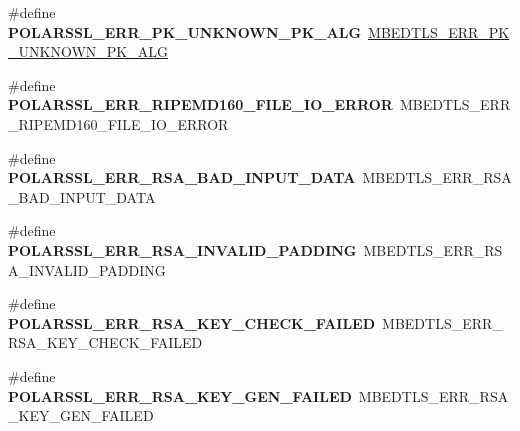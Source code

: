 \begin{DoxyCompactItemize}
\item 
\mbox{\label{compat-1_83_8h_a84d3aa6334f5ad3d67dee14c76017354}} 
\#define {\bfseries P\+O\+L\+A\+R\+S\+S\+L\+\_\+\+E\+R\+R\+\_\+\+P\+K\+\_\+\+U\+N\+K\+N\+O\+W\+N\+\_\+\+P\+K\+\_\+\+A\+LG}~\mbox{\hyperlink{pk_8h_a877b66447bfa2cd49c1b99f1dc887568}{M\+B\+E\+D\+T\+L\+S\+\_\+\+E\+R\+R\+\_\+\+P\+K\+\_\+\+U\+N\+K\+N\+O\+W\+N\+\_\+\+P\+K\+\_\+\+A\+LG}}
\item 
\mbox{\label{compat-1_83_8h_a72705f38972166097c2c3c8477baf950}} 
\#define {\bfseries P\+O\+L\+A\+R\+S\+S\+L\+\_\+\+E\+R\+R\+\_\+\+R\+I\+P\+E\+M\+D160\+\_\+\+F\+I\+L\+E\+\_\+\+I\+O\+\_\+\+E\+R\+R\+OR}~M\+B\+E\+D\+T\+L\+S\+\_\+\+E\+R\+R\+\_\+\+R\+I\+P\+E\+M\+D160\+\_\+\+F\+I\+L\+E\+\_\+\+I\+O\+\_\+\+E\+R\+R\+OR
\item 
\mbox{\label{compat-1_83_8h_aa30403951a6242045d0b47e2b51eccb0}} 
\#define {\bfseries P\+O\+L\+A\+R\+S\+S\+L\+\_\+\+E\+R\+R\+\_\+\+R\+S\+A\+\_\+\+B\+A\+D\+\_\+\+I\+N\+P\+U\+T\+\_\+\+D\+A\+TA}~M\+B\+E\+D\+T\+L\+S\+\_\+\+E\+R\+R\+\_\+\+R\+S\+A\+\_\+\+B\+A\+D\+\_\+\+I\+N\+P\+U\+T\+\_\+\+D\+A\+TA
\item 
\mbox{\label{compat-1_83_8h_a2cab7b3c4ddc3bc02ffc59db19d0400f}} 
\#define {\bfseries P\+O\+L\+A\+R\+S\+S\+L\+\_\+\+E\+R\+R\+\_\+\+R\+S\+A\+\_\+\+I\+N\+V\+A\+L\+I\+D\+\_\+\+P\+A\+D\+D\+I\+NG}~M\+B\+E\+D\+T\+L\+S\+\_\+\+E\+R\+R\+\_\+\+R\+S\+A\+\_\+\+I\+N\+V\+A\+L\+I\+D\+\_\+\+P\+A\+D\+D\+I\+NG
\item 
\mbox{\label{compat-1_83_8h_a20c78c8fb43e505b891cf0ae19535316}} 
\#define {\bfseries P\+O\+L\+A\+R\+S\+S\+L\+\_\+\+E\+R\+R\+\_\+\+R\+S\+A\+\_\+\+K\+E\+Y\+\_\+\+C\+H\+E\+C\+K\+\_\+\+F\+A\+I\+L\+ED}~M\+B\+E\+D\+T\+L\+S\+\_\+\+E\+R\+R\+\_\+\+R\+S\+A\+\_\+\+K\+E\+Y\+\_\+\+C\+H\+E\+C\+K\+\_\+\+F\+A\+I\+L\+ED
\item 
\mbox{\label{compat-1_83_8h_a1cd4e872914a9c350dee5a7deda8b51f}} 
\#define {\bfseries P\+O\+L\+A\+R\+S\+S\+L\+\_\+\+E\+R\+R\+\_\+\+R\+S\+A\+\_\+\+K\+E\+Y\+\_\+\+G\+E\+N\+\_\+\+F\+A\+I\+L\+ED}~M\+B\+E\+D\+T\+L\+S\+\_\+\+E\+R\+R\+\_\+\+R\+S\+A\+\_\+\+K\+E\+Y\+\_\+\+G\+E\+N\+\_\+\+F\+A\+I\+L\+ED
\item 
\mbox{\label{compat-1_83_8h_a1eb1e554a1fbed5abf93c566bc7751be}} 

\end{DoxyCompactItemize}
